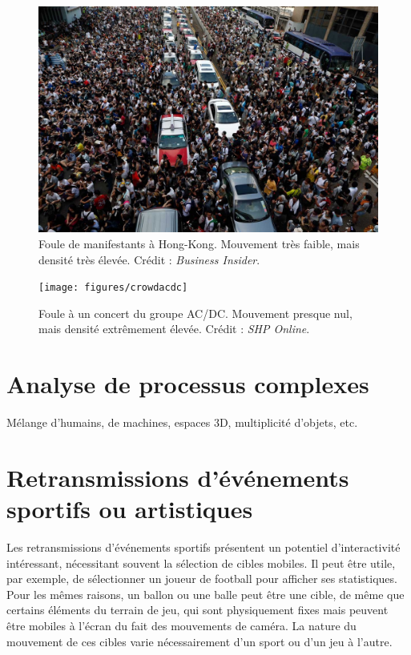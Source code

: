 	\begin{figure}[ht]
		\centering
		\includegraphics[width=\textwidth]{figures/crowdhk}
		\caption{Foule de manifestants à Hong-Kong. Mouvement très faible, mais densité très élevée. Crédit : \emph{Business Insider}.}
		\label{fig:crowdhk}
	\end{figure}
	
	\begin{figure}[ht]
		\centering
		\texttt{[image: figures/crowdacdc]}
		\caption{Foule à un concert du groupe AC/DC. Mouvement presque nul, mais densité extrêmement élevée. Crédit : \emph{SHP Online}.}
		\label{fig:crowdacdc}
	\end{figure}
	
	
	
	\section{Analyse de processus complexes}
	Mélange d'humains, de machines, espaces 3D, multiplicité d'objets, etc.
	
	\section{Retransmissions d'événements sportifs ou artistiques}
	Les retransmissions d'événements sportifs présentent un potentiel d'interactivité intéressant, nécessitant souvent la sélection de cibles mobiles. Il peut être utile, par exemple, de sélectionner un joueur de football pour afficher ses statistiques. Pour les mêmes raisons, un ballon ou une balle peut être une cible, de même que certains éléments du terrain de jeu, qui sont physiquement fixes mais peuvent être mobiles à l'écran du fait des mouvements de caméra. La nature du mouvement de ces cibles varie nécessairement d'un sport ou d'un jeu à l'autre.
	
